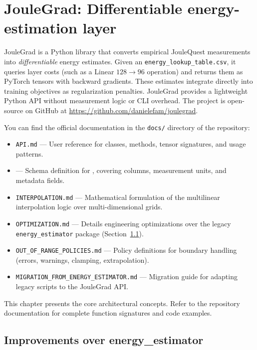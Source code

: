 \chapter{JouleGrad: Differentiable energy-estimation layer}
\label{chapter:joulegrad}

JouleGrad is a Python library that converts empirical JouleQuest measurements into \emph{differentiable} energy estimates. Given an \texttt{energy\_lookup\_table.csv}, it queries layer costs (such as a Linear $128 \to 96$ operation) and returns them as PyTorch tensors with backward gradients. These estimates integrate directly into training objectives as regularization penalties. JouleGrad provides a lightweight Python API without measurement logic or CLI overhead. The project is open-source on GitHub at \url{https://github.com/danielefam/joulegrad}.

You can find the official documentation in the \texttt{docs/} directory of the repository:
\begin{itemize}
    \item \texttt{API.md} --- User reference for classes, methods, tensor signatures, and usage patterns.
    \item {} --- Schema definition for , covering columns, measurement units, and metadata fields.
    \item \texttt{INTERPOLATION.md} --- Mathematical formulation of the multilinear interpolation logic over multi-dimensional grids.
    \item \texttt{OPTIMIZATION.md} --- Details engineering optimizations over the legacy \texttt{energy\_estimator} package (Section~\ref{sec:optimization_energy_est}).
    \item \texttt{OUT\_OF\_RANGE\_POLICIES.md} --- Policy definitions for boundary handling (errors, warnings, clamping, extrapolation).
    \item \texttt{MIGRATION\_FROM\_ENERGY\_ESTIMATOR.md} --- Migration guide for adapting legacy scripts to the JouleGrad API.
\end{itemize}
This chapter presents the core architectural concepts. Refer to the repository documentation for complete function signatures and code examples.

\section{Improvements over energy\_estimator} \label{sec:optimization_energy_est}

